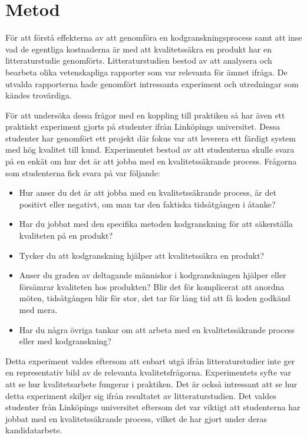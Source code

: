 \section{Metod}
\label{sec:method-wallstrom}

För att förstå effekterna av att genomföra en kodgranskningsprocess samt att inse vad de egentliga kostnaderna är med att kvalitetssäkra en produkt har en litteraturstudie genomförts. Litteraturstudien bestod av att analysera och bearbeta olika vetenskapliga rapporter som var relevanta för ämnet ifråga. De utvalda rapporterna hade genomfört intressanta experiment och utredningar som kändes trovärdiga.

För att undersöka dessa frågor med en koppling till praktiken så har även ett praktiskt experiment gjorts på studenter ifrån Linköpings universitet. Dessa studenter har genomfört ett projekt där fokus var att leverera ett färdigt system med hög kvalitet till kund. Experimentet bestod av att studenterna skulle svara på en enkät om hur det är att jobba med en kvalitetssäkrande process. Frågorna som studenterna fick svara på var följande:

\begin{itemize}
	\item Hur anser du det är att jobba med en kvalitetssäkrande process, är det positivt eller negativt, om man tar den faktiska tidsåtgången i åtanke?
	\item Har du jobbat med den specifika metoden kodgranskning för att säkerställa kvaliteten på en produkt?
	\item Tycker du att kodgranskning hjälper att kvalitetssäkra en produkt?
	\item Anser du graden av deltagande människor i kodgranskningen hjälper eller försämrar kvaliteten hos produkten? Blir det för komplicerat att anordna möten, tidsåtgången blir för stor, det tar för lång tid att få koden godkänd med mera.
	\item Har du några övriga tankar om att arbeta med en kvalitetssäkrande process eller med kodgranskning?
\end{itemize}

Detta experiment valdes eftersom att enbart utgå ifrån litteraturstudier inte ger en representativ bild av de relevanta kvalitetsfrågorna. Experimentets syfte var att se hur kvalitets\-arbete fungerar i praktiken. Det är också intressant att se hur detta experiment skiljer sig ifrån resultatet av litteraturstudien. Det valdes studenter från Linköpings universitet eftersom det var viktigt att studenterna har jobbat med en kvalitetssäkrande process, vilket de har gjort under deras kandidatarbete.

